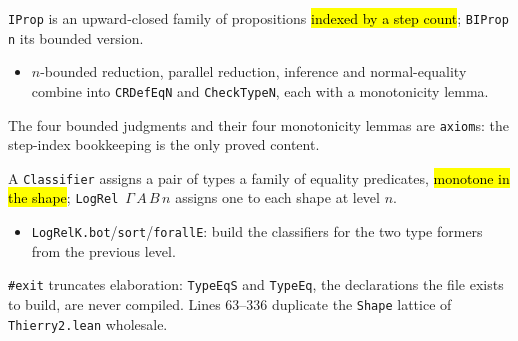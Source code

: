 \begin{definition}
\label{family:expb-morestepindexed}
\leanok
{}

 \texttt{IProp} is an upward-closed family of propositions \hl{indexed by a step
count}; \texttt{BIProp n} its bounded version.
\begin{itemize}
\item $n$-bounded reduction, parallel reduction, inference and normal-equality combine into
\texttt{CRDefEqN} and \texttt{CheckTypeN}, each with a monotonicity lemma.
\end{itemize}
 The four bounded judgments and their four monotonicity lemmas are \texttt{axiom}s:
the step-index bookkeeping is the only proved content.
\end{definition}

\begin{definition}
\label{family:expb-morestepindexed-logrel}
\leanok
{}

 A \texttt{Classifier} assigns a pair of types a family of equality predicates,
\hl{monotone in the shape}; \texttt{LogRel}~$\Gamma\,A\,B\,n$ assigns one to each shape at level
$n$.
\begin{itemize}
\item \texttt{LogRelK.bot}/\texttt{sort}/\texttt{forallE}: build the classifiers for the two type
formers from the previous level.
\end{itemize}
 \texttt{\#exit} truncates elaboration: \texttt{TypeEqS} and \texttt{TypeEq}, the
declarations the file exists to build, are never compiled. Lines 63--336 duplicate the
\texttt{Shape} lattice of \texttt{Thierry2.lean} wholesale.
\end{definition}

